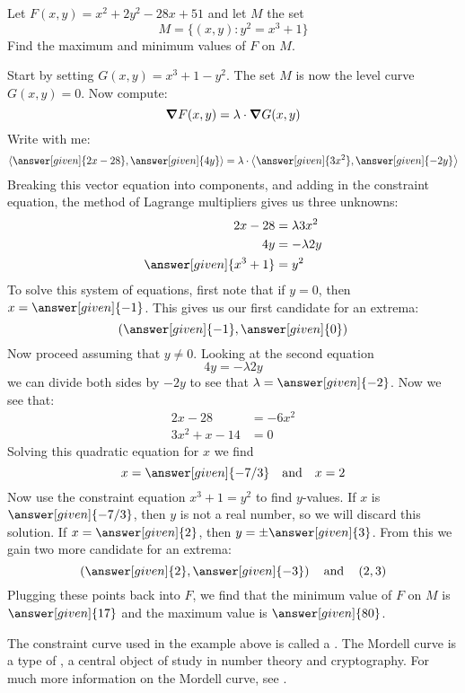 \documentclass{ximera}
\begin{document}
\begin{example}
Let $F(x,y) = x^2+2y^2-28x+51$ and let $M$ the set
\[
M = \{(x,y):y^2=x^3+1\}
\]
Find the maximum and minimum values of $F$ on $M$.
\begin{explanation}
  Start by setting $G(x,y) = x^3+1-y^2$. The set $M$ is now the level
  curve $G(x,y) = 0$. Now compute:
  \[
  \boldsymbol\nabla F(x,y) = \lambda \cdot \boldsymbol\nabla G(x,y)
  \]
  Write with me:
  \[
  \vector{\answer[given]{2x-28},\answer[given]{4y}} = \lambda \cdot \vector{\answer[given]{3x^2},\answer[given]{-2y}}
  \]
  Breaking this vector equation into components, and adding in the constraint
  equation, the method of Lagrange multipliers gives us three
  unknowns:
  \begin{align*}
    2x-28 &= \lambda 3x^2\\
    4y &= -\lambda 2y\\
    \answer[given]{x^3 + 1} &= y^2
  \end{align*}
  To solve this system of equations, first note that if $y = 0$, then
  $x=\answer[given]{-1}$. This gives us our first candidate for an extrema:
  \[
  \left(\answer[given]{-1},\answer[given]{0}\right)
  \]
  Now proceed assuming that $y\ne 0$. Looking at the second equation
  \[
  4y = -\lambda 2y
  \]
  we can divide both sides by $-2y$ to see that $\lambda = \answer[given]{-2}$. Now we see that:
  \begin{align*}
    2x-28&= -6x^2\\
    3x^2+x-14 &=0
  \end{align*}
  Solving this quadratic equation for $x$ we find
  \[
  x = \answer[given]{-7/3} \quad\text{and}\quad x = 2
  \]
  Now use the constraint equation $x^3+1=y^2$ to find $y$-values. If
  $x$ is $\answer[given]{-7/3}$, then $y$ is not a real number, so we will discard
  this solution. If $x=\answer[given]{2}$, then $y=\pm \answer[given]{3}$.  From this we gain two more
  candidate for an extrema:
  \[
  \left(\answer[given]{2},\answer[given]{-3}\right) \quad\text{and}\quad\left(2,3\right)
  \]
  Plugging these points back into $F$, we find that the minimum value
  of $F$ on $M$ is $\answer[given]{17}$ and the maximum value is
  $\answer[given]{80}$.
\end{explanation}
\end{example}

\begin{remark}
  The constraint curve used in the example above is called a . The Mordell curve is a type of , a central object of study in number theory and cryptography. For much more information on the Mordell curve, see .
\end{remark}
\end{document}
